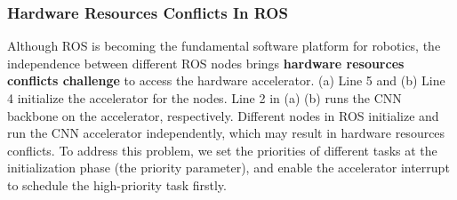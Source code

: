  


\subsubsection{Hardware Resources Conflicts In ROS} Although ROS is becoming the fundamental software platform for robotics, the independence between different ROS nodes brings \textbf{hardware resources conflicts challenge} to access the hardware accelerator. 
(a) Line 5 and (b) Line 4 initialize the accelerator for the nodes. Line 2 in (a) (b) runs the CNN backbone on the accelerator, respectively. Different nodes in ROS initialize and run the CNN accelerator independently, which may result in hardware resources conflicts. To address this problem, we set the priorities of different tasks at the initialization phase (the priority parameter), and enable the accelerator interrupt to schedule the high-priority task firstly.




